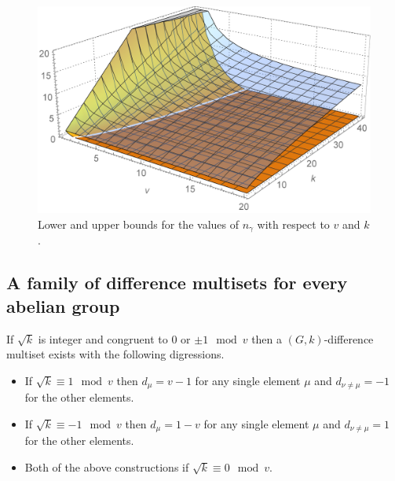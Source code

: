     \begin{figure}
        \includegraphics[width=\textwidth]{assets/boundingSurfaces}
        \caption{Lower and upper bounds for the values of $n_\gamma$ with respect to $v$ and $k$.}
        \label{general:figure:limits}
    \end{figure}
    
\subsection{A family of difference multisets for every abelian group}
    
    \begin{theorem}
        \label{regular:theorem:regular}
        If $\sqrt k$ is integer and congruent to $0$ or $\pm 1 \mod v$ then a $(G,k)$-difference multiset exists with the following digressions.
            \begin{itemize}
                \item If $\sqrt k \equiv 1 \mod v$ then $d_\mu = v-1$ for any single element $\mu$ and $d_{\nu \neq \mu} = -1$ for the other elements.
                \item If $\sqrt k \equiv -1 \mod v$ then $d_\mu =1-v$ for any single element $\mu$ and $d_{\nu \neq \mu} = 1$ for the other elements.
                \item Both of the above constructions if $\sqrt k \equiv 0 \mod v$.
            \end{itemize}
    \end{theorem}
    
